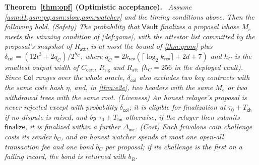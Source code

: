 \documentclass[10pt,journal,compsoc]{IEEEtran}
\theoremstyle{tplain}
\theoremstyle{tdef}
\theoremstyle{remark}
\newcommand{\Rsig}{R_{\mathsf{sig}}}
\newcommand{\Ratt}{R_{\mathsf{att}}}
\newcommand{\kr}{k_{\mathsf{rev}}}
\newcommand{\cert}{\mathsf{cert}}
\newcommand{\Vault}{\mathsf{Vault}}
\newenvironment{restate}[1]{\par\smallskip\noindent\textbf{#1.}\ \itshape\ignorespaces}{\par\smallskip}
\begin{document}
\begin{restate}{Theorem~\ref{thm:opf} (Optimistic acceptance)}
Assume \cref{asm:l1,asm:pq,asm:slow,asm:watcher} and the timing conditions above. Then the following hold. (Safety) The probability that $\Vault$ finalizes a proposal whose $M_e$ meets the winning condition of \cref{def:game}, with the attestor list committed by the proposal's snapshot of $\Ratt$, is at most the bound of \cref{thm:qrom} plus $\delta_{\mathsf{col}}=(12t^3+2q_C)/2^{h_C}$, where $q_C=2\kr(\lceil\log_2\kr\rceil+2d+7)$ and $h_C$ is the smallest output width of $C_{\cert}$, $\Rsig$ and $\Ratt$ ($h_C=256$ in the deployed vault). Since $\mathsf{Col}$ ranges over the whole oracle, $\delta_{\mathsf{col}}$ also excludes two key contracts with the same code hash $\eta$, and, in \cref{thm:e2e}, two headers with the same $M_e$ or two withdrawal trees with the same root. (Liveness) An honest relayer's proposal is never rejected except with probability $\delta_{\mathsf{col}}$; it is eligible for finalization at $\tau_0+T_{\mathsf{ch}}$ if no dispute is raised, and by $\tau_0+T_{\mathsf{fin}}$ otherwise; if the relayer then submits $\mathsf{finalize}$, it is finalized within a further $\Delta_{\mathsf{inc}}$. (Cost) Each frivolous coin challenge costs its sender $b_C$, and an honest watcher spends at most one open-all transaction fee and one bond $b_C$ per proposal; if its challenge is the first on a failing record, the bond is returned with $b_R$.
\end{restate}
\end{document}
